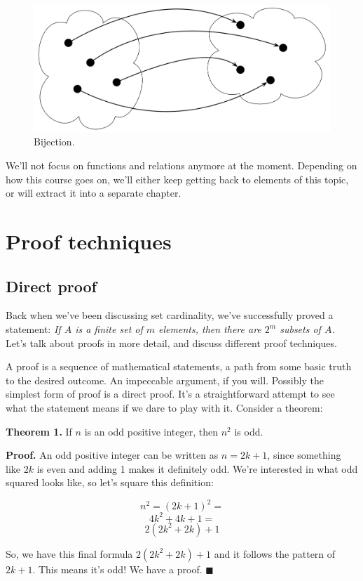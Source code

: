 \documentclass[a4paper, justified, notitlepage, sfsidenotes, notoc]{tufte-book}
\begin{document}
\begin{figure}
  \includegraphics[width=.5\linewidth,right]{images/relations/bijection.png}
  \caption{Bijection.}
  \label{fig:bijection}
\end{figure}

We'll not focus on functions and relations anymore at the moment. Depending on how this course goes on, we'll either keep getting back to elements of this topic, or will extract it into a separate chapter.

\chapter{Proof techniques}
\label{sec:org4ff0fef}

\section{Direct proof}
\label{sec:org20add57}

Back when we've been discussing set cardinality, we've successfully proved a statement: \emph{If \(A\) is a finite set of \(m\) elements, then there are \(2^{m}\) subsets of \(A\).} Let's talk about proofs in more detail, and discuss different proof techniques.

A proof is a sequence of mathematical statements, a path from some basic truth to the desired outcome. An impeccable argument, if you will. Possibly the simplest form of proof is a direct proof. It's a straightforward attempt to see what the statement means if we dare to play with it. Consider a theorem:

\textbf{Theorem 1.} If \(n\) is an odd positive integer, then \(n^2\) is odd.

\textbf{Proof.} An odd positive integer can be written as \(n = 2k + 1\), since something like \(2k\) is even and adding 1 makes it definitely odd. We're interested in what odd squared looks like, so let's square this definition:

$$ n^2 = (2k + 1)^2 = $$
$$ 4k^2 + 4k + 1 = $$
$$ 2(2k^2 + 2k) + 1 $$

So, we have this final formula \(2(2k^2 + 2k) + 1\) and it follows the pattern of \(2k + 1\). This means it's odd! We have a proof. \(\blacksquare\)
\end{document}
